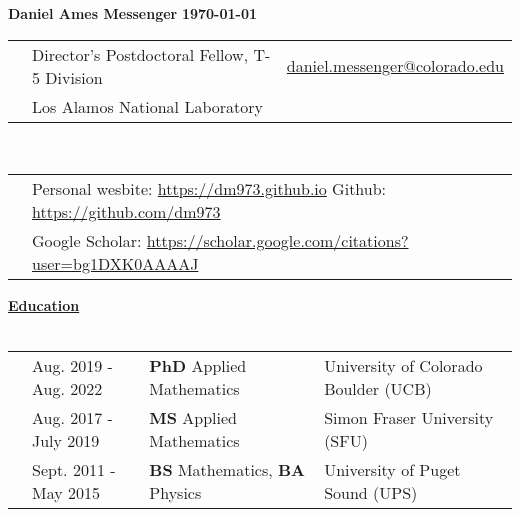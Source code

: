 \documentclass[letterpaper,11pt,oneside]{article}
\newcommand{\headr}[1]{\vspace{10pt}\uline{\Large{\textbf{#1}} \hfill } \\ \vspace{-10pt}\\}
\begin{document}
%
\noindent 
\LARGE{\textbf{Daniel Ames Messenger} \hspace{1.7in} \textbf{\monthyeardate\today}} 
\normalsize
%
%
\begin{center}
\begin{tabular}{@{} p{0.01cm} @{} p{10cm} @{} p{6.5cm}@{} }
& Director's Postdoctoral Fellow, T-5 Division & \hspace{0.5in} \href{mailto:daniel.messenger@colorado.edu}{daniel.messenger@colorado.edu} \\
& Los Alamos National Laboratory    & \hspace{3.2cm}   \\
\end{tabular}\\ \vspace{0.25cm}
\begin{tabular}{@{} p{0.01cm} @{} p{16.5cm}@{} }
& Personal wesbite: \url{https://dm973.github.io} \hspace{2cm} Github: \url{https://github.com/dm973} \\
& Google Scholar: \url{https://scholar.google.com/citations?user=bg1DXK0AAAAJ}
\end{tabular}
\end{center}


\headr{Education}
 
\begin{tabular}{@{} p{0.01cm} @{} p{4.3cm} @{} p{5.7cm} @{} p{8cm}@{} }
& Aug. 2019 - Aug. 2022 & \textbf{PhD} Applied Mathematics & University of Colorado Boulder (UCB)\\ 
& Aug. 2017 - July 2019 & \textbf{MS} Applied Mathematics & Simon Fraser University (SFU)\\ 
& Sept. 2011 - May 2015  & \textbf{BS} Mathematics, \textbf{BA} Physics & University of Puget Sound (UPS)
\end{tabular}

\end{document}
